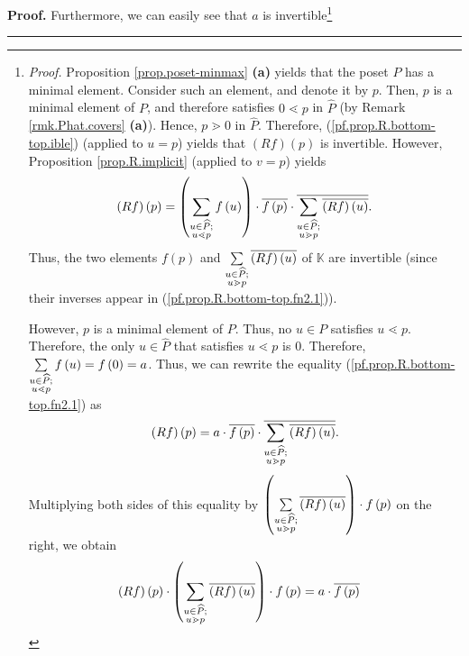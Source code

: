 \documentclass[numbers=enddot,12pt,final,onecolumn,notitlepage]{scrartcl}%
\theoremstyle{definition}
\newenvironment{verlong}{}{}
\newenvironment{proof}[1][Proof]{\noindent\textbf{#1.} }{\ \rule{0.5em}{0.5em}}
\let\sumnonlimits\sum
\renewcommand{\sum}{\sumnonlimits\limits}
\begin{document}
\begin{verlong}
\begin{proof}
Furthermore, we can easily see that $a$ is invertible\footnote{\textit{Proof.}
Proposition \ref{prop.poset-minmax} \textbf{(a)} yields that the poset $P$ has
a minimal element. Consider such an element, and denote it by $p$. Then, $p$
is a minimal element of $P$, and therefore satisfies $0\lessdot p$ in
$\widehat{P}$ (by Remark \ref{rmk.Phat.covers} \textbf{(a)}). Hence,
$p\gtrdot0$ in $\widehat{P}$. Therefore, (\ref{pf.prop.R.bottom-top.ible})
(applied to $u=p$) yields that $\left(  Rf\right)  \left(  p\right)  $ is
invertible. However, Proposition \ref{prop.R.implicit} (applied to $v=p$)
yields%
\begin{equation}
\left(  Rf\right)  \left(  p\right)  =\left(  \sum\limits_{\substack{u\in
\widehat{P};\\u\lessdot p}}f\left(  u\right)  \right)  \cdot\overline{f\left(
p\right)  }\cdot\overline{\sum\limits_{\substack{u\in\widehat{P};\\u\gtrdot
p}}\overline{\left(  Rf\right)  \left(  u\right)  }}.
\label{pf.prop.R.bottom-top.fn2.1}%
\end{equation}
Thus, the two elements $f\left(  p\right)  $ and $\sum\limits_{\substack{u\in
\widehat{P};\\u\gtrdot p}}\overline{\left(  Rf\right)  \left(  u\right)  }$ of
$\mathbb{K}$ are invertible (since their inverses appear in
(\ref{pf.prop.R.bottom-top.fn2.1})).
\par
However, $p$ is a minimal element of $P$. Thus, no $u\in P$ satisfies
$u\lessdot p$. Therefore, the only $u\in\widehat{P}$ that satisfies $u\lessdot
p$ is $0$. Therefore, $\sum\limits_{\substack{u\in\widehat{P};\\u\lessdot
p}}f\left(  u\right)  =f\left(  0\right)  =a$. Thus, we can rewrite the
equality (\ref{pf.prop.R.bottom-top.fn2.1}) as%
\[
\left(  Rf\right)  \left(  p\right)  =a\cdot\overline{f\left(  p\right)
}\cdot\overline{\sum\limits_{\substack{u\in\widehat{P};\\u\gtrdot p}%
}\overline{\left(  Rf\right)  \left(  u\right)  }}.
\]
Multiplying both sides of this equality by $\left(  \sum
\limits_{\substack{u\in\widehat{P};\\u\gtrdot p}}\overline{\left(  Rf\right)
\left(  u\right)  }\right)  \cdot f\left(  p\right)  $ on the right, we obtain%
\begin{align*}
\left(  Rf\right)  \left(  p\right)  \cdot\left(  \sum\limits_{\substack{u\in
\widehat{P};\\u\gtrdot p}}\overline{\left(  Rf\right)  \left(  u\right)
}\right)  \cdot f\left(  p\right)   &  =a\cdot\overline{f\left(  p\right)
}
\end{align*}}
\end{proof}
\end{verlong}
\end{document}
